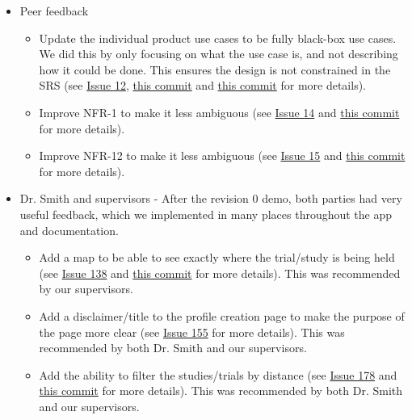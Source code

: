 \documentclass{article}
\begin{document}
\begin{itemize}
    \item Peer feedback
    \begin{itemize}
        \item Update the individual product use cases to be fully black-box use cases. We did this by only focusing on what the use case is, and not describing how it could be done. This ensures the design is not constrained in the SRS (see \href{https://github.com/davimang/REACH/issues/12}{Issue 12}, \href{https://github.com/davimang/REACH/commit/7b80cb5d97721e50163f8874ba8e1d98c0bc45f9}{this commit} and \href{https://github.com/davimang/REACH/commit/916252afc158618ca8039c603c2f46ad836c0947}{this commit} for more details). 
        \item Improve NFR-1 to make it less ambiguous (see \href{https://github.com/davimang/REACH/issues/14}{Issue 14} and \href{https://github.com/davimang/REACH/commit/6e514cf91ae0eae4c481530bf3403c99eb11770b}{this commit} for more details).
        \item Improve NFR-12 to make it less ambiguous (see \href{https://github.com/davimang/REACH/issues/15}{Issue 15} and \href{https://github.com/davimang/REACH/commit/6e514cf91ae0eae4c481530bf3403c99eb11770b}{this commit} for more details).
    \end{itemize}
    \item Dr. Smith and supervisors - After the revision 0 demo, both parties had very useful feedback, which we implemented in many places throughout the app and documentation.
    \begin{itemize}
        \item Add a map to be able to see exactly where the trial/study is being held (see \href{https://github.com/davimang/REACH/issues/138}{Issue 138} and \href{https://github.com/davimang/REACH/commit/8b6dd42a8c4585f0ac4a0efce1ea32024c65f6c0}{this commit} for more details). This was recommended by our supervisors.
        \item Add a disclaimer/title to the profile creation page to make the purpose of the page more clear (see \href{https://github.com/davimang/REACH/issues/155}{Issue 155} for more details). This was recommended by both Dr. Smith and our supervisors.
        \item Add the ability to filter the studies/trials by distance (see \href{https://github.com/davimang/REACH/issues/178}{Issue 178} and \href{https://github.com/davimang/REACH/commit/8b6dd42a8c4585f0ac4a0efce1ea32024c65f6c0}{this commit} for more details). This was recommended by both Dr. Smith and our supervisors.
    \end{itemize}
\end{itemize}
\end{document}
